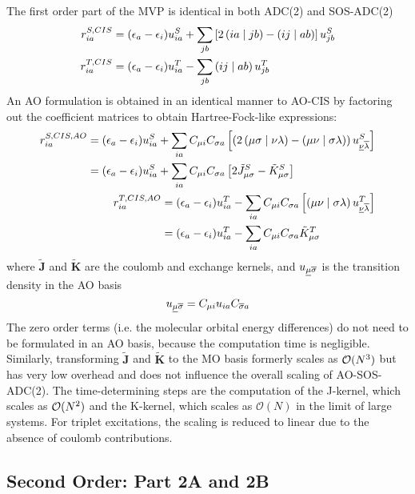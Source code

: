 The first order part of the MVP is identical in both ADC(2) and SOS-ADC(2)
\begin{align}
r_{ia}^{S,CIS} &= (\epsilon_a - \epsilon_i) u^S_{ia} + \sum_{jb} \left[ 2\left( ia \mid jb \right) - \left( ij \mid ab \right)\right] u^S_{jb} \\
r_{ia}^{T,CIS} &= (\epsilon_a - \epsilon_i) u^T_{ia} - \sum_{jb} \left( ij \mid ab \right) u^T_{jb} 
\end{align}
\noindent An AO formulation is obtained in an identical manner to AO-CIS by factoring out the coefficient matrices to obtain Hartree-Fock-like expressions:
\begin{align}
\begin{split}
r_{ia}^{S,CIS,AO} &= (\epsilon_a - \epsilon_i) u^S_{ia} + \sum_{ia} C_{\mu i} C_{\sigma a} \left[ \left( 2\left( \mu\sigma \mid \nu\lambda \right) - \left( \mu\nu \mid \sigma\lambda \right) \right) u^S_{\underline{\nu} \overline{\lambda}} \right] \\
&= (\epsilon_a - \epsilon_i) u^S_{ia} + \sum_{ia} C_{\mu i} C_{\sigma a} \left[ 2\tilde{J}^S_{\mu\sigma} - \tilde{K}^S_{\mu\sigma} \right]
\end{split}
\\
\begin{split}
r_{ia}^{T,CIS,AO} &= (\epsilon_a - \epsilon_i) u^T_{ia} - \sum_{ia} C_{\mu i} C_{\sigma a} \left[ \left( \mu\nu \mid \sigma\lambda \right) u^T_{\underline{\nu} \overline{\lambda}} \right] \\
&= (\epsilon_a - \epsilon_i) u^T_{ia} - \sum_{ia} C_{\mu i} C_{\sigma a} \tilde{K}^T_{\mu\sigma} 
\end{split}
\end{align}
\noindent where $\mathbf{\tilde{J}}$ and $\mathbf{\tilde{K}}$ are the coulomb and exchange kernels, and $u_{\underline{\mu}\overline{\sigma}}$ is the transition density in the AO basis
\begin{equation}
u_{\underline{\mu}\overline{\sigma}} = C_{\mu i} u_{ia} C_{\overline{\sigma} a}
\end{equation}
\noindent The zero order terms (i.e. the molecular orbital energy differences) do not need to be formulated in an AO basis, because the computation time is negligible. Similarly, transforming $\mathbf{\tilde{J}}$ and $\mathbf{\tilde{K}}$ to the MO basis formerly scales as $\mathcal{O}(N^{3})$ but has very low overhead and does not influence the overall scaling of AO-SOS-ADC(2). The time-determining steps are the computation of the J-kernel, which scales as $\mathcal{O}(N^{2})$ and the K-kernel, which scales as $\mathcal{O}(N)$ in the limit of large systems. For triplet excitations, the scaling is reduced to linear due to the absence of coulomb contributions.

\subsection{Second Order: Part 2A and 2B}

